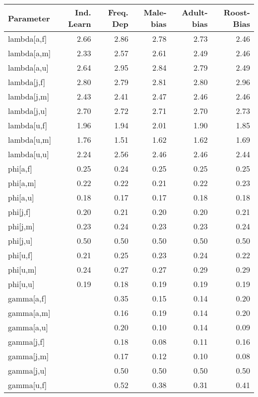 \begin{table}[ht]
\centering
\begingroup\scriptsize
\begin{tabular}{lrrrrr}
  \hline
Parameter & Ind. Learn & Freq. Dep & Male-bias & Adult-bias & Roost-Bias \\ 
  \hline
lambda[a,f] & 2.66 & 2.86 & 2.78 & 2.73 & 2.46 \\ 
  lambda[a,m] & 2.33 & 2.57 & 2.61 & 2.49 & 2.46 \\ 
  lambda[a,u] & 2.64 & 2.95 & 2.84 & 2.79 & 2.49 \\ 
  lambda[j,f] & 2.80 & 2.79 & 2.81 & 2.80 & 2.96 \\ 
  lambda[j,m] & 2.43 & 2.41 & 2.47 & 2.46 & 2.46 \\ 
  lambda[j,u] & 2.70 & 2.72 & 2.71 & 2.70 & 2.73 \\ 
  lambda[u,f] & 1.96 & 1.94 & 2.01 & 1.90 & 1.85 \\ 
  lambda[u,m] & 1.76 & 1.51 & 1.62 & 1.62 & 1.69 \\ 
  lambda[u,u] & 2.24 & 2.56 & 2.46 & 2.46 & 2.44 \\ 
  phi[a,f] & 0.25 & 0.24 & 0.25 & 0.25 & 0.25 \\ 
  phi[a,m] & 0.22 & 0.22 & 0.21 & 0.22 & 0.23 \\ 
  phi[a,u] & 0.18 & 0.17 & 0.17 & 0.18 & 0.18 \\ 
  phi[j,f] & 0.20 & 0.21 & 0.20 & 0.20 & 0.21 \\ 
  phi[j,m] & 0.23 & 0.24 & 0.23 & 0.23 & 0.24 \\ 
  phi[j,u] & 0.50 & 0.50 & 0.50 & 0.50 & 0.50 \\ 
  phi[u,f] & 0.21 & 0.25 & 0.23 & 0.24 & 0.22 \\ 
  phi[u,m] & 0.24 & 0.27 & 0.27 & 0.29 & 0.29 \\ 
  phi[u,u] & 0.19 & 0.18 & 0.19 & 0.19 & 0.19 \\ 
  gamma[a,f] &  & 0.35 & 0.15 & 0.14 & 0.20 \\ 
  gamma[a,m] &  & 0.16 & 0.19 & 0.14 & 0.20 \\ 
  gamma[a,u] &  & 0.20 & 0.10 & 0.14 & 0.09 \\ 
  gamma[j,f] &  & 0.18 & 0.08 & 0.11 & 0.16 \\ 
  gamma[j,m] &  & 0.17 & 0.12 & 0.10 & 0.08 \\ 
  gamma[j,u] &  & 0.50 & 0.50 & 0.50 & 0.50 \\ 
  gamma[u,f] &  & 0.52 & 0.38 & 0.31 & 0.41 \\ 

\end{tabular}
\end{table}
